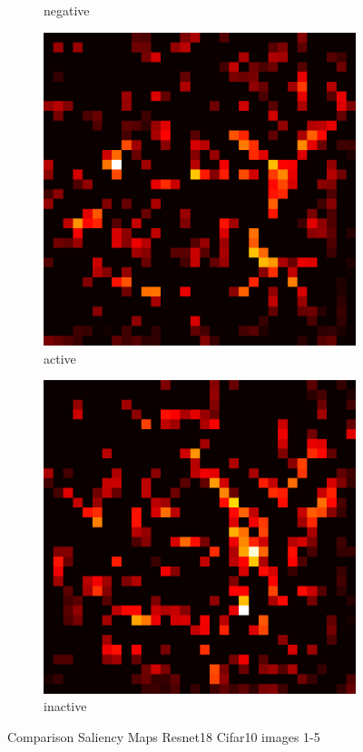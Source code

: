 \documentclass[preprint,12pt]{elsarticle}
\begin{document}
\begin{figure}
\begin{subfigure}{0.14\textwidth}
        \caption{negative}
    \end{subfigure}
    \hfill
    \begin{subfigure}{0.14\textwidth}
        \centering
        \includegraphics[width=\linewidth]{../visualizations/examples/cifar10/resnet18/active_saliency_map/4.png}
        \caption{active}
    \end{subfigure}
    \hfill
    \begin{subfigure}{0.14\textwidth}
        \centering
        \includegraphics[width=\linewidth]{../visualizations/examples/cifar10/resnet18/inactive_saliency_map/4.png}
        \caption{inactive}
    \end{subfigure}
    \hfill
    \caption{Comparison Saliency Maps Resnet18 Cifar10 images 1-5}
\end{figure}
\end{document}
